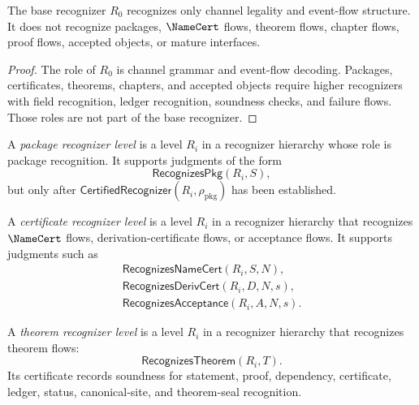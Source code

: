 \begin{proposition}
\label{prop:recognizer-generated-base-no-math-structure}
The base recognizer $R_0$ recognizes only channel legality and event-flow structure. It does not recognize packages, $\NameCert$ flows, theorem flows, chapter flows, proof flows, accepted objects, or mature interfaces.
\end{proposition}

\begin{proof}
The role of $R_0$ is channel grammar and event-flow decoding. Packages, certificates, theorems, chapters, and accepted objects require higher recognizers with field recognition, ledger recognition, soundness checks, and failure flows. Those roles are not part of the base recognizer.
\end{proof}

\begin{definition}
\label{def:recognizer-generated-package-level}
A \emph{package recognizer level} is a level $R_i$ in a recognizer hierarchy whose role is package recognition. It supports judgments of the form
$$
  \mathsf{RecognizesPkg}(R_i,S),
$$
but only after $\mathsf{CertifiedRecognizer}(R_i,\rho_{\mathrm{pkg}})$ has been established.
\end{definition}

\begin{definition}
\label{def:recognizer-generated-certificate-level}
A \emph{certificate recognizer level} is a level $R_i$ in a recognizer hierarchy that recognizes $\NameCert$ flows, derivation-certificate flows, or acceptance flows. It supports judgments such as
$$
\begin{gathered}
  \mathsf{RecognizesNameCert}(R_i,S,N),\\
  \mathsf{RecognizesDerivCert}(R_i,D,N,s),\\
  \mathsf{RecognizesAcceptance}(R_i,A,N,s).
\end{gathered}
$$
\end{definition}

\begin{definition}
\label{def:recognizer-generated-theorem-level}
A \emph{theorem recognizer level} is a level $R_i$ in a recognizer hierarchy that recognizes theorem flows:
$$
  \mathsf{RecognizesTheorem}(R_i,T).
$$
Its certificate records soundness for statement, proof, dependency, certificate, ledger, status, canonical-site, and theorem-seal recognition.
\end{definition}

